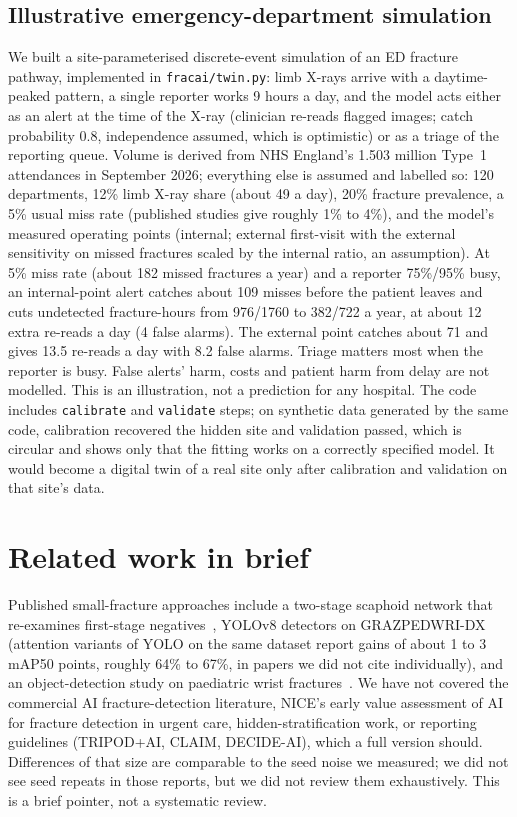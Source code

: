 \documentclass[11pt]{article}
\begin{document}
\subsection{Illustrative emergency-department simulation}
We built a site-parameterised discrete-event simulation of an ED fracture pathway, implemented in \texttt{fracai/twin.py}: limb X-rays arrive with a daytime-peaked pattern, a single reporter works 9 hours a day, and the model acts either as an alert at the time of the X-ray (clinician re-reads flagged images; catch probability 0.8, independence assumed, which is optimistic) or as a triage of the reporting queue. Volume is derived from NHS England's 1.503 million Type~1 attendances in September 2026; everything else is assumed and labelled so: 120 departments, 12\% limb X-ray share (about 49 a day), 20\% fracture prevalence, a 5\% usual miss rate (published studies give roughly 1\% to 4\%), and the model's measured operating points (internal; external first-visit with the external sensitivity on missed fractures scaled by the internal ratio, an assumption). At 5\% miss rate (about 182 missed fractures a year) and a reporter 75\%/95\% busy, an internal-point alert catches about 109 misses before the patient leaves and cuts undetected fracture-hours from 976/1760 to 382/722 a year, at about 12 extra re-reads a day (4 false alarms). The external point catches about 71 and gives 13.5 re-reads a day with 8.2 false alarms. Triage matters most when the reporter is busy. False alerts' harm, costs and patient harm from delay are not modelled. This is an illustration, not a prediction for any hospital. The code includes \texttt{calibrate} and \texttt{validate} steps; on synthetic data generated by the same code, calibration recovered the hidden site and validation passed, which is circular and shows only that the fitting works on a correctly specified model. It would become a digital twin of a real site only after calibration and validation on that site's data.

\section{Related work in brief}
Published small-fracture approaches include a two-stage scaphoid network that re-examines first-stage negatives~\cite{Yoon_2021}, YOLOv8 detectors on GRAZPEDWRI-DX~\cite{Ju_2023} (attention variants of YOLO on the same dataset report gains of about 1 to 3 mAP50 points, roughly 64\% to 67\%, in papers we did not cite individually), and an object-detection study on paediatric wrist fractures~\cite{Zech_2023}. We have not covered the commercial AI fracture-detection literature, NICE's early value assessment of AI for fracture detection in urgent care, hidden-stratification work, or reporting guidelines (TRIPOD+AI, CLAIM, DECIDE-AI), which a full version should. Differences of that size are comparable to the seed noise we measured; we did not see seed repeats in those reports, but we did not review them exhaustively. This is a brief pointer, not a systematic review.
\end{document}
